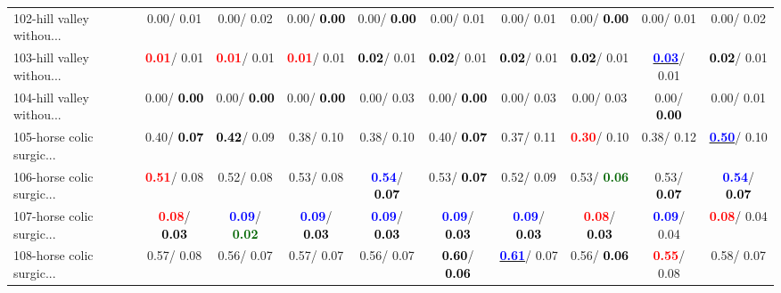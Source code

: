 \begin{table}[h]
\begin{center}
{\begin{tabular}{lc|c|c|c|c|c|c|c|c}
102-hill valley withou... &   0.00/  0.01 &   0.00/  0.02 &   0.00/\textcolor{black}{\textbf{  0.00}} &   0.00/\textcolor{black}{\textbf{  0.00}} &   0.00/  0.01 &   0.00/  0.01 &   0.00/\textcolor{black}{\textbf{  0.00}} &   0.00/  0.01 &   0.00/  0.02 \\
103-hill valley withou... & \textcolor{red}{\textbf{  0.01}}/  0.01 & \textcolor{red}{\textbf{  0.01}}/  0.01 & \textcolor{red}{\textbf{  0.01}}/  0.01 & \textcolor{black}{\textbf{  0.02}}/  0.01 & \textcolor{black}{\textbf{  0.02}}/  0.01 & \textcolor{black}{\textbf{  0.02}}/  0.01 & \textcolor{black}{\textbf{  0.02}}/  0.01 & \underline{\textcolor{blue}{\textbf{  0.03}}}/  0.01 & \textcolor{black}{\textbf{  0.02}}/  0.01 \\ \hline
104-hill valley withou... &   0.00/\textcolor{black}{\textbf{  0.00}} &   0.00/\textcolor{black}{\textbf{  0.00}} &   0.00/\textcolor{black}{\textbf{  0.00}} &   0.00/  0.03 &   0.00/\textcolor{black}{\textbf{  0.00}} &   0.00/  0.03 &   0.00/  0.03 &   0.00/\textcolor{black}{\textbf{  0.00}} &   0.00/  0.01 \\
105-horse colic surgic... &   0.40/\textcolor{black}{\textbf{  0.07}} & \textcolor{black}{\textbf{  0.42}}/  0.09 &   0.38/  0.10 &   0.38/  0.10 &   0.40/\textcolor{black}{\textbf{  0.07}} &   0.37/  0.11 & \textcolor{red}{\textbf{  0.30}}/  0.10 &   0.38/  0.12 & \underline{\textcolor{blue}{\textbf{  0.50}}}/  0.10 \\
106-horse colic surgic... & \textcolor{red}{\textbf{  0.51}}/  0.08 &   0.52/  0.08 &   0.53/  0.08 & \textcolor{blue}{\textbf{  0.54}}/\textcolor{black}{\textbf{  0.07}} &   0.53/\textcolor{black}{\textbf{  0.07}} &   0.52/  0.09 &   0.53/\textcolor{darkgreen}{\textbf{  0.06}} &   0.53/\textcolor{black}{\textbf{  0.07}} & \textcolor{blue}{\textbf{  0.54}}/\textcolor{black}{\textbf{  0.07}} \\
107-horse colic surgic... & \textcolor{red}{\textbf{  0.08}}/\textcolor{black}{\textbf{  0.03}} & \textcolor{blue}{\textbf{  0.09}}/\textcolor{darkgreen}{\textbf{  0.02}} & \textcolor{blue}{\textbf{  0.09}}/\textcolor{black}{\textbf{  0.03}} & \textcolor{blue}{\textbf{  0.09}}/\textcolor{black}{\textbf{  0.03}} & \textcolor{blue}{\textbf{  0.09}}/\textcolor{black}{\textbf{  0.03}} & \textcolor{blue}{\textbf{  0.09}}/\textcolor{black}{\textbf{  0.03}} & \textcolor{red}{\textbf{  0.08}}/\textcolor{black}{\textbf{  0.03}} & \textcolor{blue}{\textbf{  0.09}}/  0.04 & \textcolor{red}{\textbf{  0.08}}/  0.04 \\
108-horse colic surgic... &   0.57/  0.08 &   0.56/  0.07 &   0.57/  0.07 &   0.56/  0.07 & \textcolor{black}{\textbf{  0.60}}/\textcolor{black}{\textbf{  0.06}} & \underline{\textcolor{blue}{\textbf{  0.61}}}/  0.07 &   0.56/\textcolor{black}{\textbf{  0.06}} & \textcolor{red}{\textbf{  0.55}}/  0.08 &   0.58/  0.07 \\

\end{tabular}}
\end{center}
\end{table}

